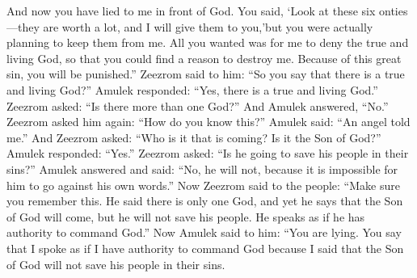 And now you have lied to me in front of God. You said, \lq Look at these six onties---they are worth a lot, and I will give them to you,\rq  but you were actually planning to keep them from me. All you wanted was for me to deny the true and living God, so that you could find a reason to destroy me. Because of this great sin, you will be punished.''
\bverse \iffalse And Zeezrom said unto him: Thou sayest there is a true and living God? \fi
Zeezrom said to him: ``So you say that there is a true and living God?''
\bverse \iffalse And Amulek said: Yea, there is a true and living God. \fi
Amulek responded: ``Yes, there is a true and living God.''
\bverse \iffalse Now Zeezrom said: Is there more than one God? \fi
Zeezrom asked: ``Is there more than one God?''
\bverse \iffalse And he answered, No. \fi
And Amulek answered, ``No.''
\bverse \iffalse Now Zeezrom said unto him again: How knowest thou these things? \fi
Zeezrom asked him again: ``How do you know this?''
\bverse \iffalse And he said: An angel hath made them known unto me. \fi
Amulek said: ``An angel told me.''
\bverse \iffalse And Zeezrom said again: Who is he that shall come? Is it the Son of God? \fi
And Zeezrom asked: ``Who is it that is coming? Is it the Son of God?''
\bverse \iffalse And he said unto him, Yea. \fi
Amulek responded: ``Yes.''
\bverse \iffalse And Zeezrom said again: Shall he save his people in their sins? And Amulek answered and said unto him: I say unto you he shall not, for it is impossible for him to deny his word. \fi
Zeezrom asked: ``Is he going to save his people in their sins?'' Amulek answered and said: ``No, he will not, because it is impossible for him to go against his own words.''
\bverse \iffalse Now Zeezrom said unto the people: See that ye remember these things; for he said there is but one God; yet he saith that the Son of God shall come, but he shall not save his people--as though he had authority to command God. \fi
Now Zeezrom said to the people: ``Make sure you remember this. He said there is only one God, and yet he says that the Son of God will come, but he will not save his people. He speaks as if he has authority to command God.''
\bverse \iffalse Now Amulek saith again unto him: Behold thou hast lied, for thou sayest that I spake as though I had authority to command God because I said he shall not save his people in their sins. \fi
Now Amulek said to him: ``You are lying. You say that I spoke as if I have authority to command God because I said that the Son of God will not save his people in their sins.
